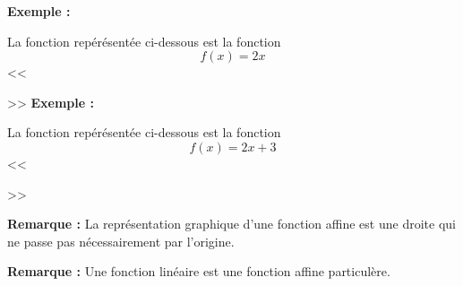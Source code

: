 \documentclass{thecours}
\begin{document}
    {\bfseries Exemple :}\par\vskip10pt
    La fonction repérésentée ci-dessous est la fonction
    $$f(x)=2x$$
    \exported[scale=0.8,]%
    <<>>
    \newpage
    {\bfseries Exemple :}\par\vskip10pt
    La fonction repérésentée ci-dessous est la fonction
    $$f(x)=2x+3$$
    \exported[scale=0.8,]%
    <<>>\par\medskip\noindent
    {\bfseries Remarque :} La représentation graphique d'une fonction affine est une
    droite qui ne passe pas nécessairement par l'origine.\par\medskip\noindent
    {\bfseries Remarque :} Une fonction linéaire est une fonction affine particulère.
\end{document}
